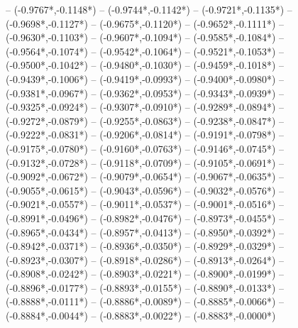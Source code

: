 {	-- ({-0.9767*\dx},{-0.1148*\dy})
	-- ({-0.9744*\dx},{-0.1142*\dy})
	-- ({-0.9721*\dx},{-0.1135*\dy})
	-- ({-0.9698*\dx},{-0.1127*\dy})
	-- ({-0.9675*\dx},{-0.1120*\dy})
	-- ({-0.9652*\dx},{-0.1111*\dy})
	-- ({-0.9630*\dx},{-0.1103*\dy})
	-- ({-0.9607*\dx},{-0.1094*\dy})
	-- ({-0.9585*\dx},{-0.1084*\dy})
	-- ({-0.9564*\dx},{-0.1074*\dy})
	-- ({-0.9542*\dx},{-0.1064*\dy})
	-- ({-0.9521*\dx},{-0.1053*\dy})
	-- ({-0.9500*\dx},{-0.1042*\dy})
	-- ({-0.9480*\dx},{-0.1030*\dy})
	-- ({-0.9459*\dx},{-0.1018*\dy})
	-- ({-0.9439*\dx},{-0.1006*\dy})
	-- ({-0.9419*\dx},{-0.0993*\dy})
	-- ({-0.9400*\dx},{-0.0980*\dy})
	-- ({-0.9381*\dx},{-0.0967*\dy})
	-- ({-0.9362*\dx},{-0.0953*\dy})
	-- ({-0.9343*\dx},{-0.0939*\dy})
	-- ({-0.9325*\dx},{-0.0924*\dy})
	-- ({-0.9307*\dx},{-0.0910*\dy})
	-- ({-0.9289*\dx},{-0.0894*\dy})
	-- ({-0.9272*\dx},{-0.0879*\dy})
	-- ({-0.9255*\dx},{-0.0863*\dy})
	-- ({-0.9238*\dx},{-0.0847*\dy})
	-- ({-0.9222*\dx},{-0.0831*\dy})
	-- ({-0.9206*\dx},{-0.0814*\dy})
	-- ({-0.9191*\dx},{-0.0798*\dy})
	-- ({-0.9175*\dx},{-0.0780*\dy})
	-- ({-0.9160*\dx},{-0.0763*\dy})
	-- ({-0.9146*\dx},{-0.0745*\dy})
	-- ({-0.9132*\dx},{-0.0728*\dy})
	-- ({-0.9118*\dx},{-0.0709*\dy})
	-- ({-0.9105*\dx},{-0.0691*\dy})
	-- ({-0.9092*\dx},{-0.0672*\dy})
	-- ({-0.9079*\dx},{-0.0654*\dy})
	-- ({-0.9067*\dx},{-0.0635*\dy})
	-- ({-0.9055*\dx},{-0.0615*\dy})
	-- ({-0.9043*\dx},{-0.0596*\dy})
	-- ({-0.9032*\dx},{-0.0576*\dy})
	-- ({-0.9021*\dx},{-0.0557*\dy})
	-- ({-0.9011*\dx},{-0.0537*\dy})
	-- ({-0.9001*\dx},{-0.0516*\dy})
	-- ({-0.8991*\dx},{-0.0496*\dy})
	-- ({-0.8982*\dx},{-0.0476*\dy})
	-- ({-0.8973*\dx},{-0.0455*\dy})
	-- ({-0.8965*\dx},{-0.0434*\dy})
	-- ({-0.8957*\dx},{-0.0413*\dy})
	-- ({-0.8950*\dx},{-0.0392*\dy})
	-- ({-0.8942*\dx},{-0.0371*\dy})
	-- ({-0.8936*\dx},{-0.0350*\dy})
	-- ({-0.8929*\dx},{-0.0329*\dy})
	-- ({-0.8923*\dx},{-0.0307*\dy})
	-- ({-0.8918*\dx},{-0.0286*\dy})
	-- ({-0.8913*\dx},{-0.0264*\dy})
	-- ({-0.8908*\dx},{-0.0242*\dy})
	-- ({-0.8903*\dx},{-0.0221*\dy})
	-- ({-0.8900*\dx},{-0.0199*\dy})
	-- ({-0.8896*\dx},{-0.0177*\dy})
	-- ({-0.8893*\dx},{-0.0155*\dy})
	-- ({-0.8890*\dx},{-0.0133*\dy})
	-- ({-0.8888*\dx},{-0.0111*\dy})
	-- ({-0.8886*\dx},{-0.0089*\dy})
	-- ({-0.8885*\dx},{-0.0066*\dy})
	-- ({-0.8884*\dx},{-0.0044*\dy})
	-- ({-0.8883*\dx},{-0.0022*\dy})
	-- ({-0.8883*\dx},{-0.0000*\dy})
}
